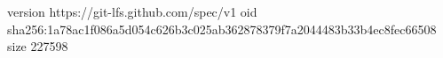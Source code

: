 version https://git-lfs.github.com/spec/v1
oid sha256:1a78ac1f086a5d054c626b3c025ab362878379f7a2044483b33b4ec8fec66508
size 227598
